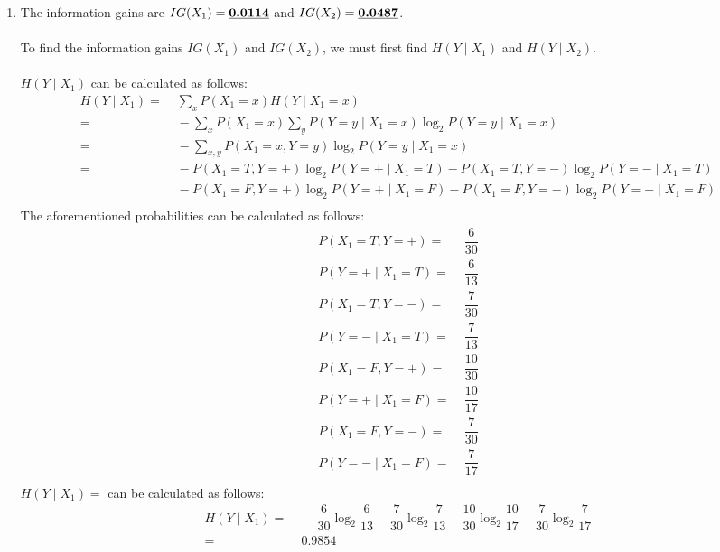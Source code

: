 \documentclass[english]{article}
\begin{document}
\begin{enumerate}
\begin{enumerate}
  \item The information gains are $IG(X_1) = \textbf{\underline{0.0114}}$ and $IG(X_2) = \textbf{\underline{0.0487}}$. \\ \\
  To find the information gains $IG(X_1)$ and $IG(X_2)$, we must first find $H(Y \mid X_1)$ and $H(Y \mid X_2)$. \\ \\
  $H(Y \mid X_1)$ can be calculated as follows:
    \begin{align*}
      H(Y \mid X_1) = &\; \sum_{x} P(X_1 = x) H(Y \mid X_1 = x) \\
      =&\; - \sum_{x} P(X_1 = x) \sum_{y} P(Y = y \mid X_1 = x) \log_2 P(Y = y \mid X_1 = x) \\
      =&\; - \sum_{x, y} P(X_1 = x, Y = y) \log_2 P(Y = y \mid X_1 = x) \\
      =&\; - P(X_1 = T, Y = +) \log_2 P(Y = + \mid X_1 = T) - P(X_1 = T, Y = -) \log_2 P(Y = - \mid X_1 = T) \\
      &\; - P(X_1 = F, Y = +) \log_2 P(Y = + \mid X_1 = F) - P(X_1 = F, Y = -) \log_2 P(Y = - \mid X_1 = F) \\
    \end{align*}
  The aforementioned probabilities can be calculated as follows: \\
    \begin{align*}
      P(X_1 = T, Y = +) =&\; \dfrac{6}{30} \\
      P(Y = + \mid X_1 = T) =&\; \dfrac{6}{13} \\
      P(X_1 = T, Y = -) =&\; \dfrac{7}{30} \\
      P(Y = - \mid X_1 = T) =&\; \dfrac{7}{13} \\
      P(X_1 = F, Y = +) =&\; \dfrac{10}{30} \\
      P(Y = + \mid X_1 = F) =&\; \dfrac{10}{17} \\
      P(X_1 = F, Y = -) =&\; \dfrac{7}{30} \\
      P(Y = - \mid X_1 = F) =&\; \dfrac{7}{17} \\
    \end{align*}
  $H(Y \mid X_1)=$ can be calculated as follows: \\
    \begin{align*}
      H(Y \mid X_1) = &\; - \dfrac{6}{30} \log_2 \dfrac{6}{13} - \dfrac{7}{30} \log_2 \dfrac{7}{13} - \dfrac{10}{30} \log_2 \dfrac{10}{17} - \dfrac{7}{30} \log_2 \dfrac{7}{17} \\
      = &\; 0.9854 \\

\end{align*}
\end{enumerate}
\end{enumerate}
\end{document}
